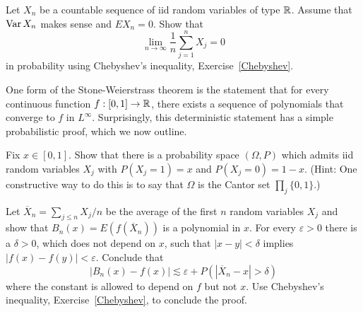 \begin{exercise}
Let $X_{n}$ be a countable sequence of iid random variables of type $\mathbb{R}$.
Assume that $\operatorname{Var} X_{n}$ makes sense and $EX_{n} = 0$. Show that
\[\lim_{n \to \infty} \frac{1}{n} \sum_{j=1}^{n} X_{j} = 0\]
in probability using Chebyshev's inequality, Exercise~\ref{Chebyshev}.
\end{exercise}

\begin{exercise}
One form of the Stone-Weierstrass theorem is the statement that for every continuous function $f: [0, 1] \to \mathbb{R}$, there exists a sequence of polynomials that converge to $f$ in $L^{\infty}$.
Surprisingly, this deterministic statement has a simple probabilistic proof, which we now outline.

Fix $x \in [0, 1]$.
Show that there is a probability space $(\Omega, P)$ which admits iid random variables $X_{j}$ with $P(X_{j} = 1) = x$ and $P(X_{j} = 0) = 1 - x$.
(Hint: One constructive way to do this is to say that $\Omega$ is the Cantor set $\prod_{j} \{0, 1\}$.)

Let $\overline X_{n} = \sum_{j \leq n} X_{j}/n$ be the average of the first $n$ random variables $X_{j}$ and show that $B_{n}(x) = E(f(\overline X_{n}))$ is a polynomial in $x$.
For every $\varepsilon > 0$ there is a $\delta > 0$, which does not depend on $x$, such that $|x - y| < \delta$ implies $|f(x) - f(y)| < \varepsilon$.
Conclude that
\[|B_{n}(x) - f(x)| \lesssim \varepsilon + P(|\overline X_{n} - x| > \delta)\]
where the constant is allowed to depend on $f$ but not $x$.
Use Chebyshev's inequality, Exercise~\ref{Chebyshev}, to conclude the proof.
\end{exercise}
